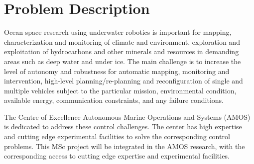 
\section*{Problem Description}
Ocean space research using underwater robotics is important for mapping, characterization and monitoring of climate and environment, exploration and exploitation of hydrocarbons and other minerals and resources in demanding areas such as deep water and under ice. The main challenge is to increase the level of autonomy and robustness for automatic mapping, monitoring and intervention, high-level planning/re-planning and reconfiguration of single and multiple vehicles subject to the particular mission, environmental condition, available energy, communication constraints, and any failure conditions.

The Centre of Excellence Autonomous Marine Operations and Systems (AMOS) is dedicated to address these control challenges. The center has high expertise and cutting edge experimental facilities to solve the corresponding control problems. This MSc project will be integrated in the AMOS research, with the corresponding access to cutting edge expertise and experimental facilities.

